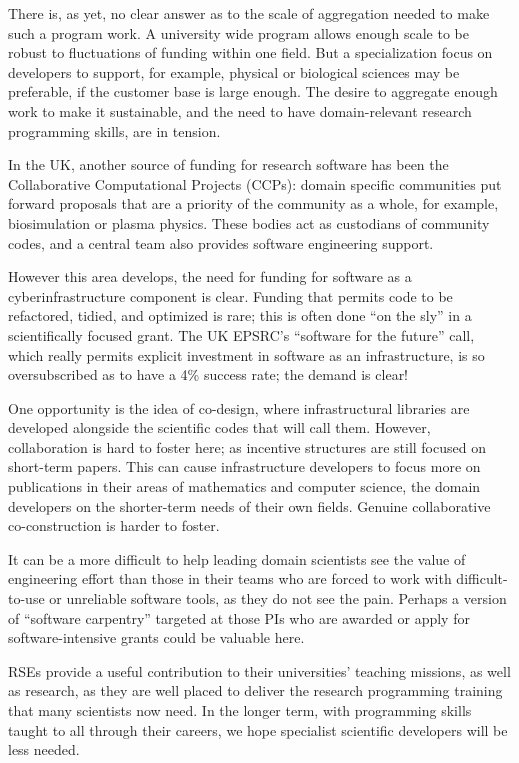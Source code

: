 There is, as yet, no clear answer as to the scale of aggregation needed to make
such a program work. A university wide program allows enough scale to be robust
to fluctuations of funding within one field. But a specialization focus on
developers to support, for example, physical or biological sciences may be
preferable, if the customer base is large enough. The desire to aggregate enough
work to make it sustainable, and the need to have domain-relevant research
programming skills, are in tension.

In the UK, another source of funding for research software has been the
Collaborative Computational Projects (CCPs): domain specific communities put
forward proposals that are a priority of the community as a whole, for example,
biosimulation or plasma physics. These bodies act as custodians of community
codes, and a central team also provides software engineering support.

However this area develops, the need for funding for software as a
cyberinfrastructure component is clear.  Funding that permits code to be
refactored, tidied, and optimized is rare; this is often done ``on the sly'' in a
scientifically focused grant. The UK EPSRC's ``software for the future'' call,
which really permits explicit investment in software as an infrastructure, is so
oversubscribed as to have a 4\% success rate; the demand is clear!

One opportunity is the idea of co-design, where infrastructural libraries are
developed alongside the scientific codes that will call them. However,
collaboration is hard to foster here; as incentive structures are still focused
on short-term papers. This can cause infrastructure developers to focus more on
publications in their areas of mathematics and computer science, the domain developers on the
shorter-term needs of their own fields. Genuine collaborative co-construction is
harder to foster.

It can be a more difficult to help leading domain scientists see the value of
engineering effort than those in their teams who are forced to work with
difficult-to-use or unreliable software tools, as they do not see the pain.
Perhaps a version of ``software carpentry'' targeted at those PIs who are
awarded or apply for software-intensive grants could be valuable here.

RSEs provide a useful contribution to their universities' teaching
missions, as well as research, as they are well placed to deliver the
research programming training that many scientists now need. In the longer term,
with programming skills taught to all through their careers, we hope specialist
scientific developers will be less needed.

